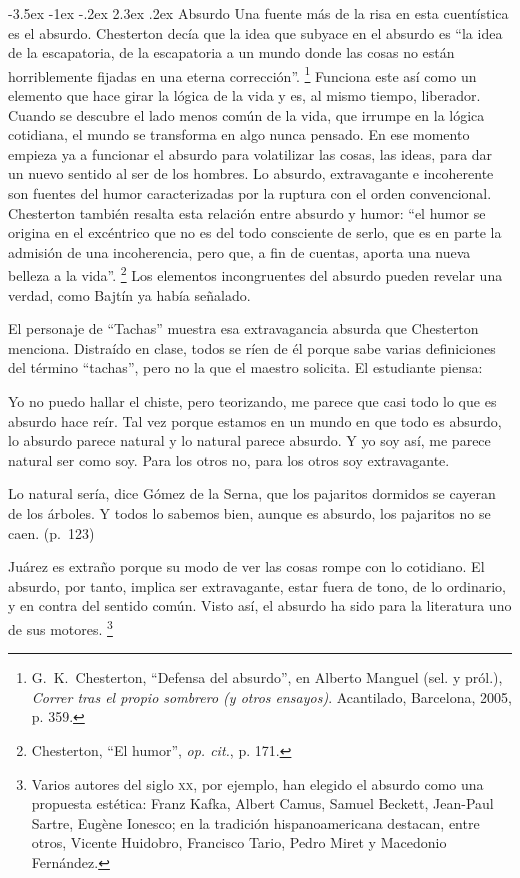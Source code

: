 \documentclass[14pt,twoside,final]{extbook} %
\makeatletter
\let\oldfootnote\footnote
\renewcommand\footnote[1]{%
\oldfootnote{\hspace{1mm}#1}}
\renewcommand\section{\@startsection {section}{1}{\z@}%
                                     {-3.5ex \@plus -1ex \@minus -.2ex}%
                                     {2.3ex \@plus .2ex}%
                                     {\normalfont\large\bfseries\sc}}
\makeatother
\begin{document}
\section{Absurdo}\label{sec:absurdo}
Una fuente más de la risa en esta cuentística es el absurdo. Chesterton decía que la idea que subyace en el absurdo es ``la idea de la escapatoria, de la escapatoria a un mundo donde las cosas no están horriblemente fijadas en una eterna corrección''.\footnote{G.~K.~Chesterton, ``Defensa del absurdo'', en Alberto Manguel (sel. y pról.), \emph{Correr tras el propio sombrero (y otros ensayos)}. Acantilado, Barcelona, 2005, p. 359.} Funciona este así como un elemento que hace girar la lógica de la vida y es, al mismo tiempo, liberador. Cuando se descubre el lado menos común de la vida, que irrumpe en la lógica cotidiana, el mundo se transforma en algo nunca pensado. En ese momento empieza ya a funcionar el absurdo para volatilizar las cosas, las ideas, para dar un nuevo sentido al ser de los hombres. Lo absurdo, extravagante e incoherente son fuentes del humor caracterizadas por la ruptura con el orden convencional. Chesterton también resalta esta relación entre absurdo y humor: ``el humor se origina en el excéntrico que no es del todo consciente de serlo, que es en parte la admisión de una incoherencia, pero que, a fin de cuentas, aporta una nueva belleza a la vida''.\footnote{Chesterton, ``El humor'', \emph{op. cit.}, p. 171.} Los elementos incongruentes del absurdo pueden revelar una verdad, como Bajtín ya había señalado.

El personaje de ``Tachas'' muestra esa extravagancia absurda que Chesterton menciona. Distraído en clase, todos se ríen de él porque sabe varias definiciones del término ``tachas'', pero no la que el maestro solicita. El estudiante piensa:
\begin{quoting}
Yo no puedo hallar el chiste, pero teorizando, me parece que casi todo lo que es absurdo hace reír. Tal vez porque estamos en un mundo en que todo es absurdo, lo absurdo parece natural y lo natural parece absurdo. Y yo soy así, me parece natural ser como soy. Para los otros no, para los otros soy extravagante.

Lo natural sería, dice Gómez de la Serna, que los pajaritos dormidos se cayeran de los árboles. Y todos lo sabemos bien, aunque es absurdo, los pajaritos no se caen. (p.~123)
\end{quoting}
Juárez es extraño porque su modo de ver las cosas rompe con lo cotidiano. El absurdo, por tanto, implica ser extravagante, estar fuera de tono, de lo ordinario, y en contra del sentido común. Visto así, el absurdo ha sido para la literatura uno de sus motores.\footnote{Varios autores del siglo \textsc{xx}, por ejemplo, han elegido el absurdo como una propuesta estética: Franz Kafka, Albert Camus, Samuel Beckett, Jean-Paul Sartre, Eugène Ionesco; en la tradición hispanoamericana destacan, entre otros, Vicente Huidobro, Francisco Tario, Pedro Miret y Macedonio Fernández.}
\end{document}
